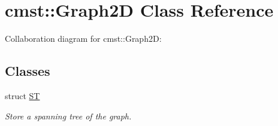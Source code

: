 \hypertarget{classcmst_1_1_graph2_d}{}\section{cmst\+:\+:Graph2D Class Reference}
\label{classcmst_1_1_graph2_d}


Collaboration diagram for cmst\+:\+:Graph2D\+:
\subsection*{Classes}
\begin{DoxyCompactItemize}
\item 
struct \hyperlink{structcmst_1_1_graph2_d_1_1_s_t}{ST}
\begin{DoxyCompactList}\small\item\em Store a spanning tree of the graph. \end{DoxyCompactList}\end{DoxyCompactItemize}
